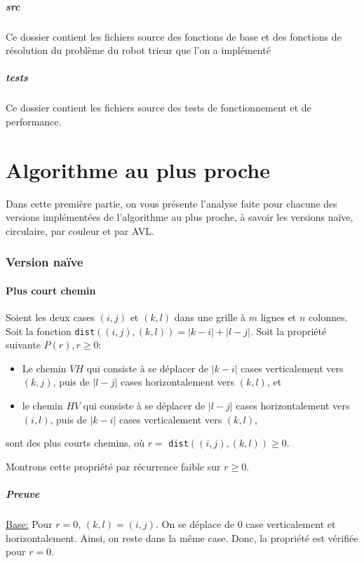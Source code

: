 \documentclass[12pt,a4paper]{article}
\begin{document}
\subsubsection*{src}
Ce dossier contient les fichiers source des fonctions de base et des fonctions 
de r\'esolution du probl\`eme du robot trieur que l'on a impl\'ement\'e
\subsubsection*{tests}
Ce dossier contient les fichiers source des tests de fonctionnement et de performance.
\newpage

\part{Algorithme au plus proche}
Dans cette premi\`ere partie, on vous pr\'esente l'analyse faite pour chacune 
des versions impl\'ement\'ees de l'algorithme au plus proche, \`a savoir les 
versions na\"ive, circulaire, par couleur et par AVL.

\section{Version na\"ive}
\subsection*{Plus court chemin}
Soient les deux cases $(i,j)$ et $(k,l)$ dans une grille \`a $m$ 
lignes et $n$ colonnes. 
Soit la fonction \texttt{dist}$((i,j),(k,l))=|k-i|+|l-j|$. Soit la 
propri\'et\'e 
suivante $P(r), r \geq 0$:
\begin{itemize}
\item Le chemin $VH$ qui consiste \`a se d\'eplacer de $|k-i|$ cases 
verticalement vers $(k,j)$, puis de $|l-j|$ cases horizontalement vers $(k,l)$, 
et
\item le chemin $HV$ qui consiste \`a se d\'eplacer de $|l-j|$ cases 
horizontalement vers $(i,l)$, puis de $|k-i|$ cases verticalement vers $(k,l)$,
\end{itemize}
sont des plus courts chemins, o\`u $r=$ \texttt{dist}$((i,j),(k,l)) \geq 0$.

Montrons cette propri\'et\'e par r\'ecurrence faible sur $r \geq 0$.

\subsubsection*{Preuve}
\underline{Base:} Pour $r=0$, $(k,l)=(i,j)$. On se d\'eplace de $0$ 
case verticalement et horizontalement. Ainsi, on reste dans la m\^eme case. 
Donc, la propri\'et\'e est v\'erifi\'ee pour $r=0$.
\end{document}
